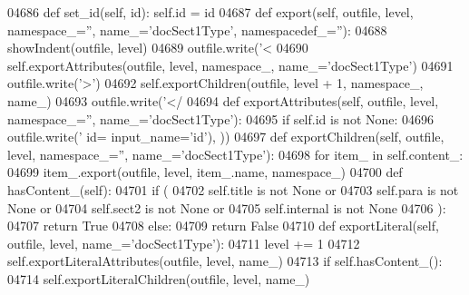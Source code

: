 \begin{DoxyCode}
{{{{{{{{{{{{{{{{{{{{{{{{{{{{{{{{{{{{{{{{{{{{{{{{{{{{{{{{{{{{{{{{{{{{{{{{{{{{{{{{{{{{{{{{{{{{{{{{{{{{{{{{{{{{{{{{{{{{{{{{{{{{{{{{{{{{{{{{{{{{{{{{{{{{{{{{{{{{{{{{{{{{{{{{{{{{{{{{{{{{{{{{{{{{{{{{{{{{{{{{{{{{{{{{{{{{{{{{{{{{{{{{{{{{{{{{{{{{{{{{{{{{{{{{{{{{{{{{{{{{{{{{{{{{{{{{{{{{{{{{{{{{{{{{{{{{{{{{{{{{{{{{{{{{{{{{{{{{{{{{04686     \textcolor{keyword}{def }set_id(self, id): self.id = id
04687     \textcolor{keyword}{def }export(self, outfile, level, namespace\_='', name\_='docSect1Type', namespacedef\_=''):
04688         showIndent(outfile, level)
04689         outfile.write(\textcolor{stringliteral}{'<%
04690         self.exportAttributes(outfile, level, namespace\_, name\_=\textcolor{stringliteral}{'docSect1Type'})
04691         outfile.write(\textcolor{stringliteral}{'>'})
04692         self.exportChildren(outfile, level + 1, namespace\_, name\_)
04693         outfile.write(\textcolor{stringliteral}{'</%
04694     \textcolor{keyword}{def }exportAttributes(self, outfile, level, namespace\_='', name\_='docSect1Type'):
04695         \textcolor{keywordflow}{if} self.id \textcolor{keywordflow}{is} \textcolor{keywordflow}{not} \textcolor{keywordtype}{None}:
04696             outfile.write(\textcolor{stringliteral}{' id=%
      input\_name=\textcolor{stringliteral}{'id'}), ))
04697     \textcolor{keyword}{def }exportChildren(self, outfile, level, namespace\_='', name\_='docSect1Type'):
04698         \textcolor{keywordflow}{for} item\_ \textcolor{keywordflow}{in} self.content_:
04699             item\_.export(outfile, level, item\_.name, namespace\_)
04700     \textcolor{keyword}{def }hasContent_(self):
04701         \textcolor{keywordflow}{if} (
04702             self.title \textcolor{keywordflow}{is} \textcolor{keywordflow}{not} \textcolor{keywordtype}{None} \textcolor{keywordflow}{or}
04703             self.para \textcolor{keywordflow}{is} \textcolor{keywordflow}{not} \textcolor{keywordtype}{None} \textcolor{keywordflow}{or}
04704             self.sect2 \textcolor{keywordflow}{is} \textcolor{keywordflow}{not} \textcolor{keywordtype}{None} \textcolor{keywordflow}{or}
04705             self.internal \textcolor{keywordflow}{is} \textcolor{keywordflow}{not} \textcolor{keywordtype}{None}
04706             ):
04707             \textcolor{keywordflow}{return} \textcolor{keyword}{True}
04708         \textcolor{keywordflow}{else}:
04709             \textcolor{keywordflow}{return} \textcolor{keyword}{False}
04710     \textcolor{keyword}{def }exportLiteral(self, outfile, level, name\_='docSect1Type'):
04711         level += 1
04712         self.exportLiteralAttributes(outfile, level, name\_)
04713         \textcolor{keywordflow}{if} self.hasContent_():
04714             self.exportLiteralChildren(outfile, level, name\_)
}}}}}}}}}}}}}}}}}}}}}}}}}}}}}}}}}}}}}}}}}}}}}}}}}}}}}}}}}}}}}}}}}}}}}}}}}}}}}}}}}}}}}}}}}}}}}}}}}}}}}}}}}}}}}}}}}}}}}}}}}}}}}}}}}}}}}}}}}}}}}}}}}}}}}}}}}}}}}}}}}}}}}}}}}}}}}}}}}}}}}}}}}}}}}}}}}}}}}}}}}}}}}}}}}}}}}}}}}}}}}}}}}}}}}}}}}}}}}}}}}}}}}}}}}}}}}}}}}}}}}}}}}}}}}}}}}}}}}}}}}}}}}}}}}}}}}}}}}}}}}}}}}}}}}}}}}}}}}}}}}}}
\end{DoxyCode}
